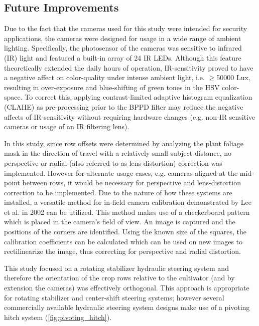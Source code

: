 \documentclass[authoryear]{elsarticle}
\begin{document}
\subsection{Future Improvements}
Due to the fact that the cameras used for this study were intended for
security applications, the cameras were designed for usage in a wide
range of ambient lighting. Specifically, the photosensor of the
cameras was sensitive to infrared (IR) light and featured a built-in
array of 24 IR LEDs. Although this feature theoretically extended the
daily hours of operation, IR-sensitivity proved to have a negative
affect on color-quality under intense ambient light, i.e. $\ge$50000 Lux,
resulting in over-exposure and blue-shifting of green tones in the HSV
color-space. To correct this, applying contrast-limited adaptive
histogram equalization (CLAHE) as pre-processing prior to the BPPD
filter may reduce the negative affects of IR-sensitivity without
requiring hardware changes (e.g. non-IR sensitive cameras or usage of
an IR filtering lens).

In this study, since row offsets were determined by analyzing the
plant foliage mask in the direction of travel with a relatively small
subject distance, no perspective or radial (also referred to as
lens-distortion) correction was implemented. However for alternate
usage cases, e.g. cameras aligned at the mid-point between rows, it
would be necessary for perspective and lens-distortion correction to
be implemented. Due to the nature of how these systems are installed,
a versatile method for in-field camera calibration demonstrated by Lee
et al. in 2002 can be utilized. This method makes use of a
checkerboard pattern which is placed in the camera’s field of view. An
image is captured and the positions of the corners are
identified. Using the known size of the squares, the calibration
coefficients can be calculated which can be used on new images to
rectilinearize the image, thus correcting for perspective and radial
distortion.

This study focused on a rotating stabilizer hydraulic steering system
and therefore the orientation of the crop rows relative to the
cultivator (and by extension the cameras) was effectively
orthogonal. This approach is appropriate for rotating stabilizer and
center-shift steering systems; however several commercially available
hydraulic steering system designs make use of a pivoting hitch system
(\ref{fig:pivoting_hitch}).
\end{document}
